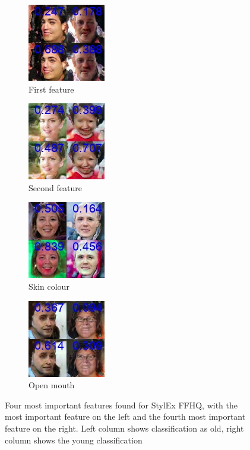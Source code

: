 \begin{figure}[H]
     \centering
     \begin{subfigure}[b]{0.24\textwidth}
     \centering
     \includegraphics[scale=0.55]{images/FFHQ_1.jpg}
     \caption{First feature}
     \label{fig:ff1}
     \end{subfigure}
     \hfill
     \begin{subfigure}[b]{0.24\textwidth}
     \centering
     \includegraphics[scale=0.55]{images/FFHQ_2.jpg}
     \caption{Second feature}
     \label{fig:ff2}
     \end{subfigure}
     \hfill
     \begin{subfigure}[b]{0.24\textwidth}
     \centering
     \includegraphics[scale=0.55]{images/FFHQ_3.jpg}
     \caption{Skin colour}
     \label{fig:ff3}
     \end{subfigure}
     \hfill
     \begin{subfigure}[b]{0.24\textwidth}
     \centering
     \includegraphics[scale=0.55]{images/FFHQ_4.jpg}
     \caption{Open mouth}
     \label{fig:ff4}
     \end{subfigure}
     \caption{Four most important features found for StylEx FFHQ, with the most important feature on the left and the fourth most important feature on the right. Left column shows classification as old, right column shows the young classification}
     \label{fig:FF_feats}
\end{figure}

